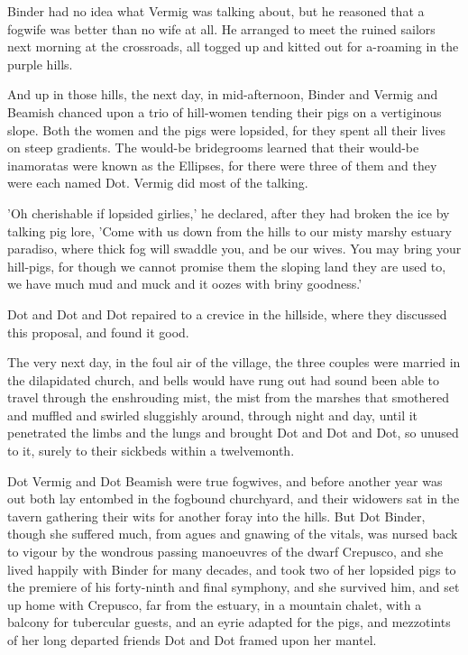 Binder had no idea what Vermig was talking about, but he reasoned that a fogwife was better than no wife at all. He arranged to meet the ruined sailors next morning at the crossroads, all togged up and kitted out for a-roaming in the purple hills.

And up in those hills, the next day, in mid-afternoon, Binder and Vermig and Beamish chanced upon a trio of hill-women tending their pigs on a vertiginous slope. Both the women and the pigs were lopsided, for they spent all their lives on steep gradients. The would-be bridegrooms learned that their would-be inamoratas were known as the Ellipses, for there were three of them and they were each named Dot. Vermig did most of the talking.

'Oh cherishable if lopsided girlies,' he declared, after they had broken the ice by talking pig lore, 'Come with us down from the hills to our misty marshy estuary paradiso, where thick fog will swaddle you, and be our wives. You may bring your hill-pigs, for though we cannot promise them the sloping land they are used to, we have much mud and muck and it oozes with briny goodness.'

Dot and Dot and Dot repaired to a crevice in the hillside, where they discussed this proposal, and found it good.

The very next day, in the foul air of the village, the three couples were married in the dilapidated church, and bells would have rung out had sound been able to travel through the enshrouding mist, the mist from the marshes that smothered and muffled and swirled sluggishly around, through night and day, until it penetrated the limbs and the lungs and brought Dot and Dot and Dot, so unused to it, surely to their sickbeds within a twelvemonth.

Dot Vermig and Dot Beamish were true fogwives, and before another year was out both lay entombed in the fogbound churchyard, and their widowers sat in the tavern gathering their wits for another foray into the hills. But Dot Binder, though she suffered much, from agues and gnawing of the vitals, was nursed back to vigour by the wondrous passing manoeuvres of the dwarf Crepusco, and she lived happily with Binder for many decades, and took two of her lopsided pigs to the premiere of his forty-ninth and final symphony, and she survived him, and set up home with Crepusco, far from the estuary, in a mountain chalet, with a balcony for tubercular guests, and an eyrie adapted for the pigs, and mezzotints of her long departed friends Dot and Dot framed upon her mantel.